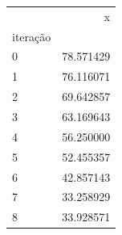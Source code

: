 \begin{tabular}{lr}
\toprule
 & x \\
iteração &  \\
\midrule
0 & 78.571429 \\
1 & 76.116071 \\
2 & 69.642857 \\
3 & 63.169643 \\
4 & 56.250000 \\
5 & 52.455357 \\
6 & 42.857143 \\
7 & 33.258929 \\
8 & 33.928571 \\
\bottomrule
\end{tabular}
